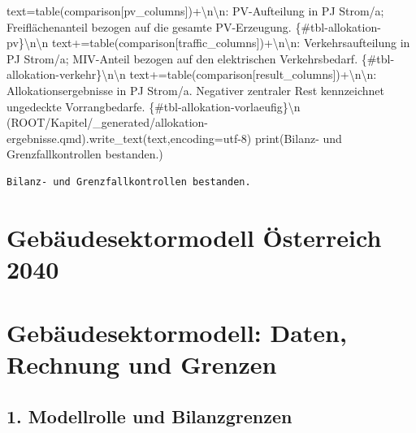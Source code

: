 \documentclass[
  ngerman,
  a4paper,
  DIV=11]{scrreprt}
\newenvironment{Shaded}{\begin{snugshade}}{\end{snugshade}}
\newcommand{\BuiltInTok}[1]{\textcolor[rgb]{0.00,0.23,0.31}{#1}}
\newcommand{\CharTok}[1]{\textcolor[rgb]{0.13,0.47,0.30}{#1}}
\newcommand{\NormalTok}[1]{\textcolor[rgb]{0.00,0.23,0.31}{#1}}
\newcommand{\OperatorTok}[1]{\textcolor[rgb]{0.37,0.37,0.37}{#1}}
\newcommand{\StringTok}[1]{\textcolor[rgb]{0.13,0.47,0.30}{#1}}
\begin{document}
\begin{Shaded}
\begin{Highlighting}[]
\NormalTok{text}\OperatorTok{=}\NormalTok{table(comparison[pv\_columns])}\OperatorTok{+}\StringTok{\textquotesingle{}}\CharTok{\textbackslash{}n\textbackslash{}n}\StringTok{: PV{-}Aufteilung in PJ Strom/a; Freiflächenanteil bezogen auf die gesamte PV{-}Erzeugung. \{\#tbl{-}allokation{-}pv\}}\CharTok{\textbackslash{}n\textbackslash{}n}\StringTok{\textquotesingle{}}
\NormalTok{text}\OperatorTok{+=}\NormalTok{table(comparison[traffic\_columns])}\OperatorTok{+}\StringTok{\textquotesingle{}}\CharTok{\textbackslash{}n\textbackslash{}n}\StringTok{: Verkehrsaufteilung in PJ Strom/a; MIV{-}Anteil bezogen auf den elektrischen Verkehrsbedarf. \{\#tbl{-}allokation{-}verkehr\}}\CharTok{\textbackslash{}n\textbackslash{}n}\StringTok{\textquotesingle{}}
\NormalTok{text}\OperatorTok{+=}\NormalTok{table(comparison[result\_columns])}\OperatorTok{+}\StringTok{\textquotesingle{}}\CharTok{\textbackslash{}n\textbackslash{}n}\StringTok{: Allokationsergebnisse in PJ Strom/a. Negativer zentraler Rest kennzeichnet ungedeckte Vorrangbedarfe. \{\#tbl{-}allokation{-}vorlaeufig\}}\CharTok{\textbackslash{}n}\StringTok{\textquotesingle{}}
\NormalTok{(ROOT}\OperatorTok{/}\StringTok{\textquotesingle{}Kapitel/\_generated/allokation{-}ergebnisse.qmd\textquotesingle{}}\NormalTok{).write\_text(text,encoding}\OperatorTok{=}\StringTok{\textquotesingle{}utf{-}8\textquotesingle{}}\NormalTok{)}
\BuiltInTok{print}\NormalTok{(}\StringTok{\textquotesingle{}Bilanz{-} und Grenzfallkontrollen bestanden.\textquotesingle{}}\NormalTok{)}
\end{Highlighting}
\end{Shaded}

\begin{verbatim}
Bilanz- und Grenzfallkontrollen bestanden.
\end{verbatim}

\chapter{Gebäudesektormodell Österreich
2040}\label{gebuxe4udesektormodell-uxf6sterreich-2040}

\chapter{Gebäudesektormodell: Daten, Rechnung und
Grenzen}\label{sec-gebaeudesektormodell}

\section{1. Modellrolle und
Bilanzgrenzen}\label{modellrolle-und-bilanzgrenzen}
\end{document}
